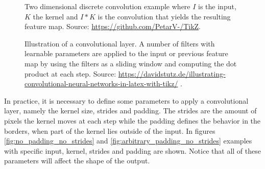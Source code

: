 \begin{itemize}
    \begin{figure}
        \centering
        
        \caption[Two dimensional discrete convolution example]{Two dimensional discrete convolution example where $I$ is the input, $K$ the kernel and $I*K$ is the convolution that yields the resulting feature map. Source: \url{https://github.com/PetarV-/TikZ}.}
        \label{fig:2dconv-ex}
    \end{figure}
    \begin{figure}
    	\centering
    	
    	\caption[Illustration of a convolutional layer]{Illustration of a convolutional layer. A number of filters with learnable parameters are applied to the input or previous feature map by using the filters as a sliding window and computing the dot product at each step. Source: \url{https://davidstutz.de/illustrating-convolutional-neural-networks-in-latex-with-tikz/} \cite{conv-graphs}.}
    	\label{fig:filters}
    \end{figure}

    In practice, it is necessary to define some parameters to apply a convolutional layer, namely the kernel size, strides and padding. The strides are the amount of pixels the kernel moves at each step while the padding defines the behavior in the borders, when part of the kernel lies outside of the input. In figures \ref{fig:no_padding_no_strides} and \ref{fig:arbitrary_padding_no_strides} examples with specific input, kernel, strides and padding are shown. Notice that all of these parameters will affect the shape of the output. 
    

\end{itemize}
